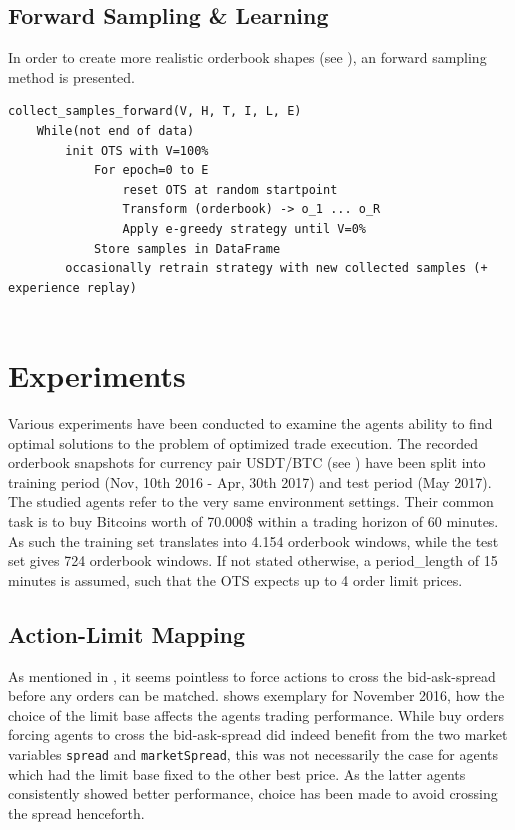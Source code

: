 


\subsection{Forward Sampling \& Learning}
In order to create more realistic orderbook shapes (see ), an forward sampling method is presented.


\begin{lstlisting}[frame=single, breaklines=true, basicstyle=\scriptsize, caption=Forward sampling approach., label=lst:forward:pseudocode]
collect_samples_forward(V, H, T, I, L, E)
    While(not end of data)
        init OTS with V=100%
            For epoch=0 to E
                reset OTS at random startpoint
	            Transform (orderbook) -> o_1 ... o_R
	            Apply e-greedy strategy until V=0%
		    Store samples in DataFrame
        occasionally retrain strategy with new collected samples (+ experience replay)
		    
\end{lstlisting}







\section{Experiments}
\label{chap:experiments}
Various experiments have been conducted to examine the agents ability to find optimal solutions to the problem of optimized trade execution. The recorded orderbook snapshots for currency pair USDT/BTC (see ) have been split into training period (Nov, 10th 2016 - Apr, 30th 2017) and test period (May 2017).\\

The studied agents refer to the very same environment settings. Their common task is to buy Bitcoins worth of 70.000\$ within a trading horizon of 60 minutes. As such the training set translates into 4.154 orderbook windows, while the test set gives 724 orderbook windows. If not stated otherwise, a period\_length of 15 minutes is assumed, such that the \ac{OTS} expects up to 4 order limit prices.



\subsection{Action-Limit Mapping}
\label{chap:exp:actionlimitmapping}
As mentioned in , it seems pointless to force actions to cross the bid-ask-spread before any orders can be matched.  shows exemplary for November 2016, how the choice of the limit base affects the agents trading performance. While buy orders forcing agents to cross the bid-ask-spread did indeed benefit from the two market variables \lstinline!spread! and \lstinline!marketSpread!, this was not necessarily the case for agents which had the limit base fixed to the other best price. As the latter agents consistently showed better performance, choice has been made to avoid crossing the spread henceforth.

